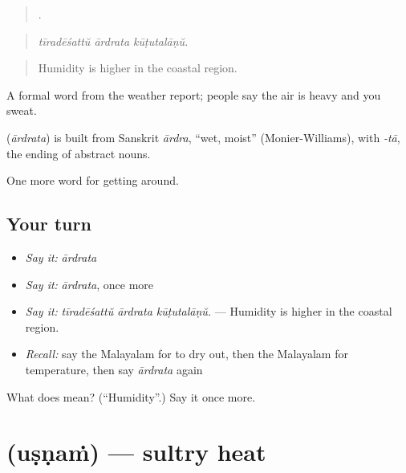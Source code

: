 \begin{quote}
  .
\end{quote}

\begin{quote}
\emph{tīradēśattŭ ārdrata kūṭutalāṇŭ.}
\end{quote}

\begin{quote}
Humidity is higher in the coastal region.
\end{quote}

A formal word from the weather report; people say the air is heavy and you sweat.

\begin{cousinweb}
\textbf{} (\emph{ārdrata}) is built from Sanskrit \emph{ārdra}, \textquotedblleft{}wet, moist\textquotedblright{} (Monier-Williams), with \emph{-tā}, the ending of abstract nouns.
\end{cousinweb}

\begin{grammarlens}[title={What you've built}]
One more word for getting around.
\end{grammarlens}

\subsection*{Your turn}
\begin{itemize}
\raggedright
  \item \emph{Say it:} \emph{ārdrata}
  \item \emph{Say it:} \emph{ārdrata}, once more
  \item \emph{Say it:} \emph{tīradēśattŭ ārdrata kūṭutalāṇŭ.} — Humidity is higher in the coastal region.
  \item \emph{Recall:} say the Malayalam for to dry out, then the Malayalam for temperature, then say \emph{ārdrata} again
\end{itemize}

\begin{tcolorbox}[breakable,colback=teal!4,colframe=teal!35!black,title={Before you move on}]
What does  mean? (\textquotedblleft{}Humidity\textquotedblright{}.) Say it once more.
\end{tcolorbox}
\section[\texorpdfstring{\ml{ഉഷ്ണം} (uṣṇaṁ)}{ഉഷ്ണം (uṣṇaṁ)}]{ (uṣṇaṁ) — sultry heat}


